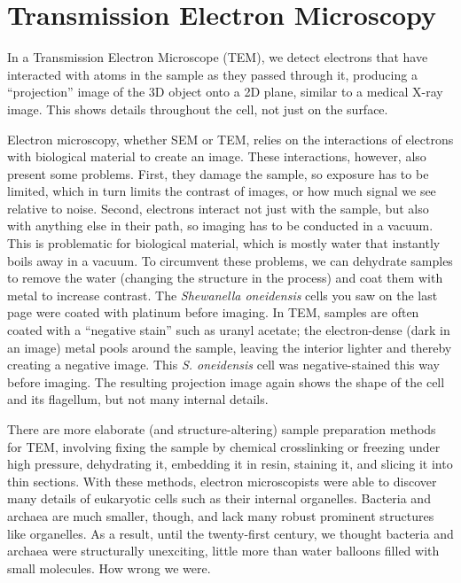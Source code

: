 \documentclass[]{tufte-book}
\begin{document}
\hypertarget{transmission-electron-microscopy}{%
\section{Transmission Electron Microscopy}\label{transmission-electron-microscopy}}

In a Transmission Electron Microscope (TEM), we detect electrons that have interacted with atoms in the sample as they passed through it, producing a ``projection'' image of the 3D object onto a 2D plane, similar to a medical X-ray image. This shows details throughout the cell, not just on the surface.

Electron microscopy, whether SEM or TEM, relies on the interactions of electrons with biological material to create an image. These interactions, however, also present some problems. First, they damage the sample, so exposure has to be limited, which in turn limits the contrast of images, or how much signal we see relative to noise. Second, electrons interact not just with the sample, but also with anything else in their path, so imaging has to be conducted in a vacuum. This is problematic for biological material, which is mostly water that instantly boils away in a vacuum. To circumvent these problems, we can dehydrate samples to remove the water (changing the structure in the process) and coat them with metal to increase contrast. The \emph{Shewanella oneidensis} cells you saw on the last page were coated with platinum before imaging. In TEM, samples are often coated with a ``negative stain'' such as uranyl acetate; the electron-dense (dark in an image) metal pools around the sample, leaving the interior lighter and thereby creating a negative image. This \emph{S. oneidensis} cell was negative-stained this way before imaging. The resulting projection image again shows the shape of the cell and its flagellum, but not many internal details.

There are more elaborate (and structure-altering) sample preparation methods for TEM, involving fixing the sample by chemical crosslinking or freezing under high pressure, dehydrating it, embedding it in resin, staining it, and slicing it into thin sections. With these methods, electron microscopists were able to discover many details of eukaryotic cells such as their internal organelles. Bacteria and archaea are much smaller, though, and lack many robust prominent structures like organelles. As a result, until the twenty-first century, we thought bacteria and archaea were structurally unexciting, little more than water balloons filled with small molecules. How wrong we were.
\end{document}
